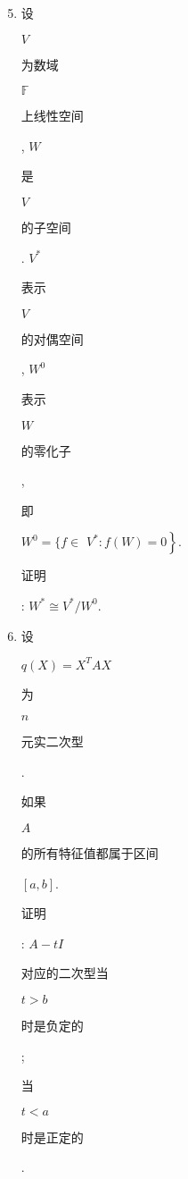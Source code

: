 \documentclass[10pt]{article}
\begin{document}
\begin{enumerate}
  \setcounter{enumi}{4}
  \item \begin{CJK}{UTF8}{mj}设\end{CJK} $V$ \begin{CJK}{UTF8}{mj}为数域\end{CJK} $\mathbb{F}$ \begin{CJK}{UTF8}{mj}上线性空间\end{CJK}, $W$ \begin{CJK}{UTF8}{mj}是\end{CJK} $V$ \begin{CJK}{UTF8}{mj}的子空间\end{CJK}. $V^{*}$ \begin{CJK}{UTF8}{mj}表示\end{CJK} $V$ \begin{CJK}{UTF8}{mj}的对偶空间\end{CJK}, $W^{0}$ \begin{CJK}{UTF8}{mj}表示\end{CJK} $W$ \begin{CJK}{UTF8}{mj}的零化子\end{CJK}, \begin{CJK}{UTF8}{mj}即\end{CJK} $W^{0}=\{f \in$ $\left.V^{*}: f(W)=0\right\}$. \begin{CJK}{UTF8}{mj}证明\end{CJK}: $W^{*} \cong V^{*} / W^{0}$.

  \item \begin{CJK}{UTF8}{mj}设\end{CJK} $q(X)=X^{T} A X$ \begin{CJK}{UTF8}{mj}为\end{CJK} $n$ \begin{CJK}{UTF8}{mj}元实二次型\end{CJK}. \begin{CJK}{UTF8}{mj}如果\end{CJK} $A$ \begin{CJK}{UTF8}{mj}的所有特征值都属于区间\end{CJK} $[a, b]$. \begin{CJK}{UTF8}{mj}证明\end{CJK}: $A-t I$ \begin{CJK}{UTF8}{mj}对应的二次型当\end{CJK} $t>b$ \begin{CJK}{UTF8}{mj}时是负定的\end{CJK}; \begin{CJK}{UTF8}{mj}当\end{CJK} $t<a$ \begin{CJK}{UTF8}{mj}时是正定的\end{CJK}.


\end{enumerate}
\end{document}
